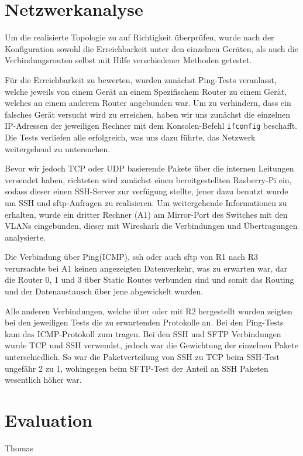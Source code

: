 \documentclass[10pt,a4paper]{article}
\begin{document}
\section{Netzwerkanalyse}
Um die realisierte Topologie zu auf Richtigkeit überprüfen, wurde nach
der Konfiguration sowohl die Erreichbarkeit unter den einzelnen
Geräten, als auch die Verbindungsrouten selbst mit Hilfe verschiedener
Methoden getestet.
\par
Für die Erreichbarkeit zu bewerten, wurden zunächst Ping-Tests
veranlasst, welche jeweils von einem Gerät an einem Spezifischem
Router zu einem Gerät, welches an einem anderem Router angebunden
war. Um zu verhindern, dass ein falsches Gerät versucht wird zu
erreichen, haben wir uns zunächst die einzelnen IP-Adressen der
jeweiligen Rechner mit dem Konsolen-Befehl \texttt{ifconfig} beschafft. Die
Tests verliefen alle erfolgreich, was uns dazu führte, das Netzwerk
weitergehend zu untersuchen.
\par 
Bevor wir jedoch TCP oder UDP basierende Pakete über die internen
Leitungen versendet haben, richteten wird zunächst einen
bereitgestellten Rasberry-Pi ein, sodass dieser einen SSH-Server zur
verfügung stellte, jener dazu benutzt wurde um SSH und sftp-Anfragen
zu realisieren. Um weitergehende Informationen zu erhalten, wurde ein
dritter Rechner (A1) am Mirror-Port des Switches mit den VLANs
eingebunden, dieser mit Wireshark die Verbindungen und Übertragungen
analysierte.
\par
Die Verbindung über Ping(ICMP), ssh oder auch sftp von R1 nach R3
verursachte bei A1 keinen angezeigten Datenverkehr, was zu erwarten
war, dar die Router 0, 1 und 3 über Static Routes verbunden sind und
somit das Routing und der Datenaustausch über jene abgewickelt wurden.
\par
Alle anderen Verbindungen, welche über oder mit R2 hergestellt wurden
zeigten bei den jeweiligen Tests die zu erwartenden Protokolle an. Bei
den Ping-Tests kam das ICMP-Protokoll zum tragen. Bei den SSH und SFTP
Verbindungen wurde TCP und SSH verwendet, jedoch war die Gewichtung
der einzelnen Pakete unterschiedlich. So war die Paketverteilung von
SSH zu TCP beim SSH-Test ungefähr 2 zu 1, wohingegen beim SFTP-Test
der Anteil an SSH Paketen wesentlich höher war.


\section{Evaluation}Thomas
\end{document}
